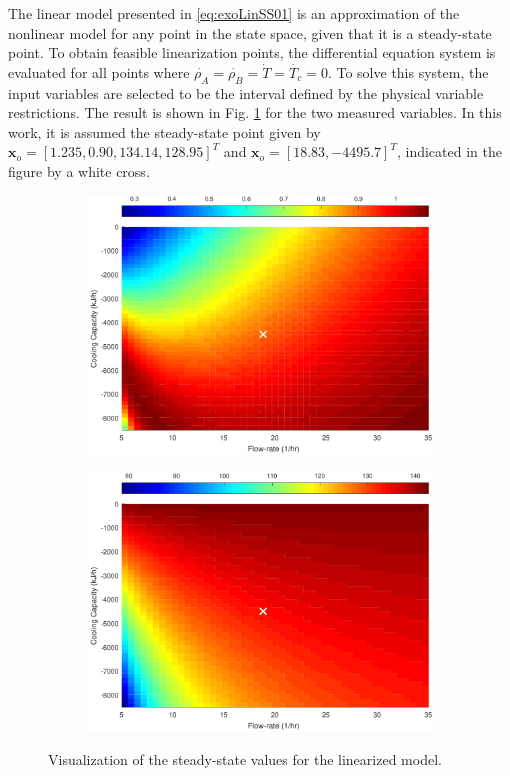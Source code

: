 \documentclass[a4paper,11pt]{book}
\numberwithin{figure}{chapter}
\numberwithin{equation}{chapter}
\numberwithin{table}{chapter}
\theoremstyle{definition}
\begin{document}
The linear model presented in \eqref{eq:exoLinSS01} is an approximation of the nonlinear model for any point in the state space, given that it is a steady-state point. To obtain feasible linearization points, the differential equation system is evaluated for all points where $\dot{\rho_A} = \dot{\rho_B} =\dot{T} =\dot{T_c} = 0$. To solve this system, the input variables are selected to be the interval defined by the physical variable restrictions. The result is shown in Fig. \ref{fig:ssValues} for the two measured variables. In this work, it is assumed the steady-state point given by $\bm{x}_o = [1.235, 0.90, 134.14, 128.95]^T$ and $\bm{x}_o = [18.83, -4495.7]^T$, indicated in the figure by a white cross.

\begin{figure}[ht] \centering
	\begin{subfigure}{0.46\textwidth}
		\includegraphics[width=\textwidth]{chapter7/ssValues01}
	\end{subfigure} \hfill
	\begin{subfigure}{0.46\textwidth}
		\includegraphics[width=\textwidth]{chapter7/ssValues02}
	\end{subfigure}
	
	\caption{Visualization of the steady-state values for the linearized model.}
	\label{fig:ssValues}
\end{figure}
\end{document}
